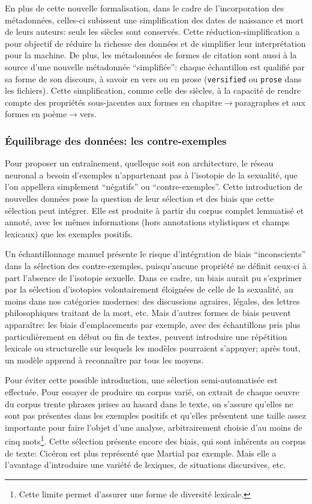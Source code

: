 En plus de cette nouvelle formalisation, dans le cadre de l'incorporation des métadonnées, celles-ci subissent une simplification des dates de naissance et mort de leurs auteurs: seuls les siècles sont conservés. Cette réduction-simplification a pour objectif de réduire la richesse des données et de simplifier leur interprétation pour la machine. De plus, les métadonnées de formes de citation sont aussi à la source d'une nouvelle métadonnée \enquote{simplifiée}: chaque échantillon est qualifié par sa forme de son discours, à savoir en vers ou en prose (\texttt{versified} ou \texttt{prose} dans les fichiers). Cette simplification, comme celle des siècles, à la capacité de rendre compte des propriétés sous-jacentes aux formes en chapitre$\longrightarrow$paragraphes et aux formes en poème$\longrightarrow$vers.


\subsubsection{Équilibrage des données: les contre-exemples}

Pour proposer un entraînement, quelleque soit son architecture, le réseau neuronal a besoin d'exemples n'appartenant pas à l'isotopie de la sexualité, que l'on appellera simplement \enquote{négatifs} ou \enquote{contre-exemples}. Cette introduction de nouvelles données pose la question de leur sélection et des biais que cette sélection peut intégrer. Elle est produite à partir du corpus complet lemmatisé et annoté, avec les mêmes informations (hors annotations stylistiques et champs lexicaux) que les exemples positifs.

Un échantillonnage manuel présente le risque d'intégration de biais \enquote{inconscients} dans la sélection des contre-exemples, puisqu'aucune propriété ne définit ceux-ci à part l'absence de l'isotopie sexuelle. Dans ce cadre, un biais aurait pu s'exprimer par la sélection d'isotopies volontairement éloignées de celle de la sexualité, au moins dans nos catégories modernes: des discussions agraires, légales, des lettres philosophiques traitant de la mort, etc. Mais d'autres formes de biais peuvent apparaître: les biais d'emplacements par exemple, avec des échantillons pris plus particulièrement en début ou fin de textes, peuvent introduire une répétition lexicale ou structurelle sur lesquels les modèles pourraient s'appuyer; après tout, un modèle apprend à reconnaître par tous les moyens.

Pour éviter cette possible introduction, une sélection semi-automatisée est effectuée. Pour essayer de produire un corpus varié, on extrait de chaque oeuvre du corpus trente phrases prises au hasard dans le texte, on s'assure qu'elles ne sont pas présentes dans les exemples positifs et qu'elles présentent une taille assez importante pour faire l'objet d'une analyse, arbitrairement choisie d'au moins de cinq mots\footnote{Cette limite permet d'assurer une forme de diversité lexicale.}. Cette sélection présente encore des biais, qui sont inhérents au corpus de texte: Cicéron est plus représenté que Martial par exemple. Mais elle a l'avantage d'introduire une variété de lexiques, de situations discursives, etc.

